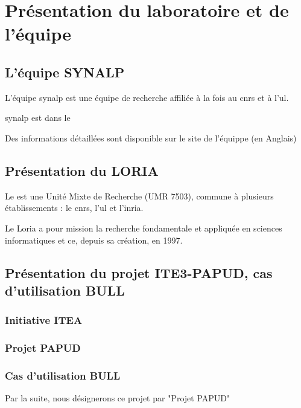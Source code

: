 
\chapter{Présentation du laboratoire et de l'équipe}
\section[SYNALP]{L'équipe SYNALP}
L'équipe \gls{synalp} est une équipe de recherche affiliée à la fois au \gls{cnrs} et à l'\gls{ul}.

\gls{synalp} est dans le 

Des informations détaillées sont disponible sur le site de l'équippe (en Anglais) \cite{about_synalp}

\section[LORIA]{Présentation du LORIA}
Le  est une Unité Mixte de Recherche (UMR 7503), commune à plusieurs établissements : le \gls{cnrs}, l’\gls{ul} et l'\gls{inria}.

Le Loria a pour mission la recherche fondamentale et appliquée en sciences informatiques et ce, depuis sa création, en 1997.

\section[ITEA3/PAPUD]{Présentation du projet ITE3-PAPUD, cas d'utilisation BULL}
\subsection*{Initiative ITEA}

\subsection*{Projet PAPUD}

\subsection*{Cas d'utilisation BULL}

Par la suite, nous désignerons ce projet par "Projet PAPUD"
